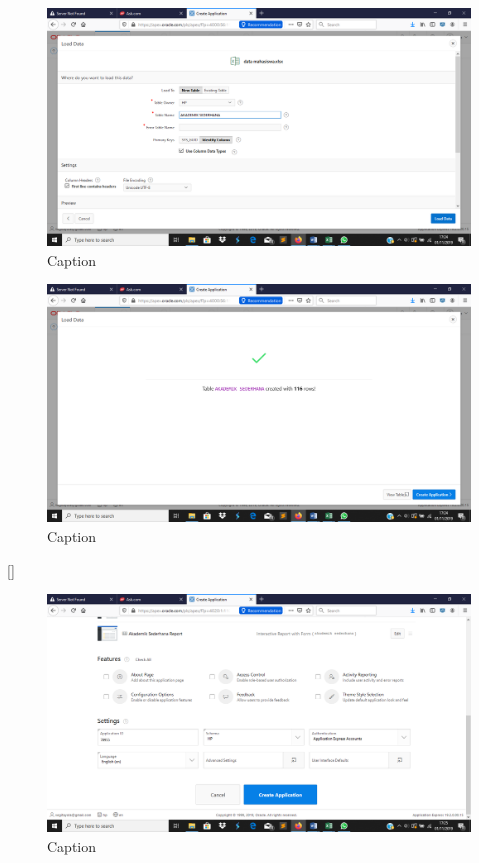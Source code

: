 \begin{enumerate}
\begin{figure}[!htbp]
    \centering
    \includegraphics[scale=0.3]{figure/15.png}
    \caption{Caption}
    \label{fig:my_label}
\end{figure}

\begin{figure}[!htbp]
    \centering
    \includegraphics[scale=0.3]{figure/16.png}
    \caption{Caption}
    \label{fig:my_label}
\end{figure}[]

\begin{figure}[!htbp]
    \centering
    \includegraphics[scale=0.3]{figure/17.png}
    \caption{Caption}
    \label{fig:my_label}
\end{figure}


\end{enumerate}
